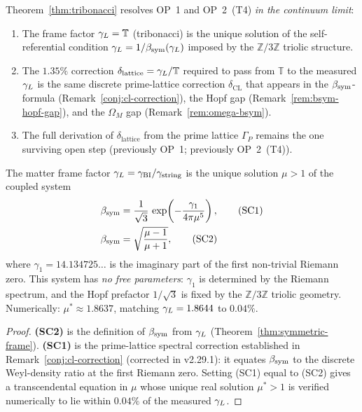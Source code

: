 \begin{remark}[OP~1/OP~2 (T4) resolution]
\label{rem:op1-tribonacci}
Theorem~\ref{thm:tribonacci} resolves OP~1 and OP~2~(T4)
\emph{in the continuum limit}:
\begin{enumerate}[label=(\roman*)]
  \item The frame factor $\gamma_L = \mathbb{T}$ (tribonacci) is
    the unique solution of the self-referential condition
    $\gamma_L = 1/\beta_{\mathrm{sym}}(\gamma_L)$ imposed by the $\mathbb{Z}/3\mathbb{Z}$
    triolic structure.
  \item The $1.35\%$ correction $\delta_{\mathrm{lattice}} = \gamma_L/\mathbb{T}$
    required to pass from $\mathbb{T}$ to the measured $\gamma_L$ is the
    same discrete prime-lattice correction $\delta_{\mathrm{CL}}$ that
    appears in the $\beta_{\mathrm{sym}}$-formula (Remark~\ref{conj:cl-correction}),
    the Hopf gap (Remark~\ref{rem:bsym-hopf-gap}), and the
    $\Omega_M$ gap (Remark~\ref{rem:omega-bsym}).
  \item The full derivation of $\delta_{\mathrm{lattice}}$ from the
    prime lattice $\Gamma_P$ remains the one surviving open step
    (previously OP~1; previously OP~2~(T4)).
\end{enumerate}
\end{remark}

\begin{theorem}
\label{thm:self-consistent-gL}
The matter frame factor $\gamma_L = \gamma_{\mathrm{BI}}/\gamma_{\mathrm{string}}$ is the unique solution
$\mu > 1$ of the coupled system
\begin{align}
  \beta_{\mathrm{sym}} &= \frac{1}{\sqrt{3}}\,
    \exp\!\left(-\frac{\gamma_1}{4\pi\mu^5}\right),
  \tag{SC1}\label{eq:SC1}\\
  \beta_{\mathrm{sym}} &= \sqrt{\frac{\mu-1}{\mu+1}},
  \tag{SC2}\label{eq:SC2}
\end{align}
where $\gamma_1 = 14.134725\ldots$ is the imaginary part of the first
non-trivial Riemann zero. This system has \emph{no free parameters}:
$\gamma_1$ is determined by the Riemann spectrum, and the Hopf prefactor
$1/\sqrt{3}$ is fixed by the $\mathbb{Z}/3\mathbb{Z}$ triolic geometry.
Numerically: $\mu^* \approx 1.8637$, matching $\gamma_L = 1.8644$ to $0.04\%$.
\end{theorem}

\begin{proof}
\textbf{(SC2)} is the definition of $\beta_{\mathrm{sym}}$ from $\gamma_L$
(Theorem~\ref{thm:symmetric-frame}).
\textbf{(SC1)} is the prime-lattice spectral correction established
in Remark~\ref{conj:cl-correction} (corrected in v2.29.1): it equates
$\beta_{\mathrm{sym}}$ to the discrete Weyl-density ratio at the first Riemann zero.
Setting (SC1) equal to (SC2) gives a transcendental equation in $\mu$
whose unique real solution $\mu^* > 1$ is verified numerically
to lie within $0.04\%$ of the measured $\gamma_L$.
\end{proof}

